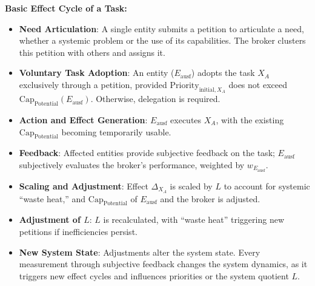 \documentclass[12pt]{scrartcl}
\begin{document}
\textbf{Basic Effect Cycle of a Task:}
\begin{itemize}
    \item \textbf{Need Articulation}: A single entity submits a petition to articulate a need, whether a systemic problem or the use of its capabilities. The broker clusters this petition with others and assigns it.
    \item \textbf{Voluntary Task Adoption}: An entity ($E_{\text{ausf}}$) adopts the task $X_A$ exclusively through a petition, provided $\text{Priority}_{\text{initial}, X_A}$ does not exceed $\text{Cap}_{\text{Potential}}(E_{\text{ausf}})$. Otherwise, delegation is required.
    \item \textbf{Action and Effect Generation}: $E_{\text{ausf}}$ executes $X_A$, with the existing $\text{Cap}_{\text{Potential}}$ becoming temporarily usable.
    \item \textbf{Feedback}: Affected entities provide subjective feedback on the task; $E_{\text{ausf}}$ subjectively evaluates the broker’s performance, weighted by $w_{E_{\text{ausf}}}$.
    \item \textbf{Scaling and Adjustment}: Effect $\Delta_{X_A}$ is scaled by $L$ to account for systemic “waste heat,” and $\text{Cap}_{\text{Potential}}$ of $E_{\text{ausf}}$ and the broker is adjusted.
    \item \textbf{Adjustment of $L$}: $L$ is recalculated, with “waste heat” triggering new petitions if inefficiencies persist.
    \item \textbf{New System State}: Adjustments alter the system state. Every measurement through subjective feedback changes the system dynamics, as it triggers new effect cycles and influences priorities or the system quotient $L$.
\end{itemize}
\end{document}
